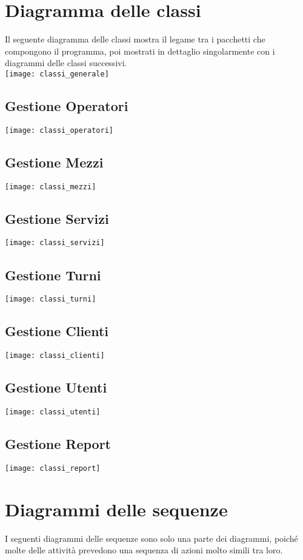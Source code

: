 \documentclass[green, fancy, 11pt]{elegantbook}
\begin{document}
\newpage
\section{Diagramma delle classi}
\noindent Il seguente diagramma delle classi mostra il legame tra i pacchetti che compongono il programma, poi mostrati in dettaglio singolarmente con i diagrammi delle classi successivi.\\
\noindent \texttt{[image: classi\_generale]}
\newpage

\subsection{Gestione Operatori}
\noindent \texttt{[image: classi\_operatori]}
\subsection{Gestione Mezzi}
\noindent \texttt{[image: classi\_mezzi]}
\newpage

\subsection{Gestione Servizi}
\noindent \texttt{[image: classi\_servizi]}
\subsection{Gestione Turni}
\noindent \texttt{[image: classi\_turni]}
\newpage

\subsection{Gestione Clienti}
\noindent \texttt{[image: classi\_clienti]}
\subsection{Gestione Utenti}
\noindent \texttt{[image: classi\_utenti]}
\newpage

\subsection{Gestione Report}
\noindent \texttt{[image: classi\_report]}
\newpage

\section{Diagrammi delle sequenze}
\noindent I seguenti diagrammi delle sequenze sono solo una parte dei diagrammi, poiché molte delle attività prevedono una sequenza di azioni molto simili tra loro.
\end{document}
